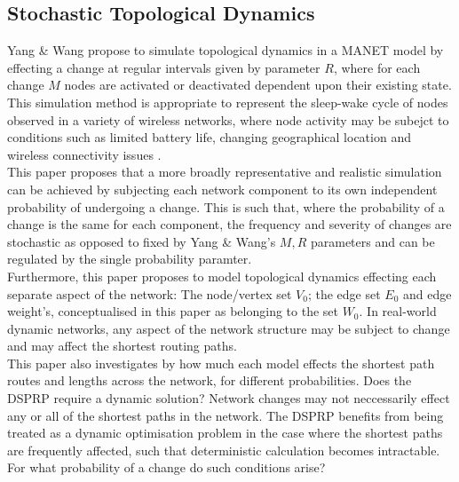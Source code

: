 \documentclass[
	a4paper, %
	10pt, %
	unnumberedsections, %
	twoside, %
]{LTJournalArticle}
\begin{document}
\lstset{
breaklines  = true,
breakatwhitespace   = false,
prebreak= \space,
postbreak   = \space,
language = Python
}



\subsection{Stochastic Topological Dynamics}

Yang \& Wang propose to simulate topological dynamics in a MANET model by effecting a change at regular intervals given by parameter \(R\), where for each change \(M\) nodes are activated or deactivated dependent upon their existing state. This simulation method is appropriate to represent the sleep-wake cycle of nodes observed in a variety of wireless networks, where node activity may be subejct to conditions such as limited battery life, changing geographical location and wireless connectivity issues \cite{yang:10}. \\

This paper proposes that a more broadly representative and realistic simulation can be achieved by subjecting each network component to its own independent probability of undergoing a change. This is such that, where the probability of a change is the same for each component, the frequency and severity of changes are stochastic as opposed to fixed by Yang \& Wang's \(M, R\) parameters and can be regulated by the single probability paramter. \\

Furthermore, this paper proposes to model topological dynamics effecting each separate aspect of the network: The node/vertex set \(V_{0}\); the edge set \(E_{0}\) and edge weight's, conceptualised in this paper as belonging to the set \(W_{0}\). In real-world dynamic networks, any aspect of the network structure may be subject to change and may affect the shortest routing paths. \\ 

This paper also investigates by how much each model effects the shortest path routes and lengths across the network, for different probabilities. Does the DSPRP require a dynamic solution? Network changes may not neccessarily effect any or all of the shortest paths in the network. The DSPRP benefits from being treated as a dynamic optimisation problem in the case where the shortest paths are frequently affected, such that deterministic calculation becomes intractable. For what probability of a change do such conditions arise? \\
\end{document}
